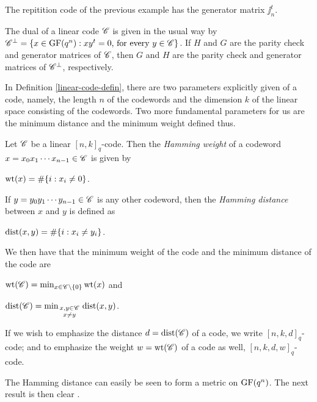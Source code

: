 \documentclass[../../../main]{subfiles}
\begin{document}
\begin{ex}
 The repitition code of the previous example has the generator matrix $\jj_n^t$.
\end{ex}

The dual of a linear code $\mathscr{C}$ is given in the usual way by $\mathscr{C}^\perp = \{x \in \text{GF}(q^n) : xy^t=0 \text{, for every }y\in\mathscr{C}\}$. If $H$ and $G$ are the parity check and generator matrices of $\mathscr{C}$, then $G$ and $H$ are the parity check and generator matrices of $\mathscr{C}^\perp$, respectively.

In Definition \ref{linear-code-defin}, there are two parameters explicitly given of a code, namely, the length $n$ of the codewords and the dimension $k$ of the linear space consisting of the codewords. Two more fundamental parameters for us are the minimum distance and the minimum weight defined thus.

\begin{defin}\label{wt-dist}
 Let $\mathscr{C}$ be a linear $[n,k]_q$-code. Then the {\it Hamming weight} of a codeword $x=x_0 x_1 \cdots x_{n-1} \in \mathscr{C}$ is given by 
 \begin{defenum}
 \item $\text{wt}(x) = \#\{i : x_i \neq 0\}$. 
 \end{defenum}
 If $y=y_0 y_1 \cdots y_{n-1} \in \mathscr{C}$ is any other codeword, then the {\it Hamming distance} between $x$ and $y$ is defined as 
 \begin{defenum}[resume]
 \item $\text{dist}(x,y) = \#\{i : x_i \neq y_i\}$. 
 \end{defenum}
 We then have that the minimum weight of the code and the minimum distance of the code are 
 \begin{defenum}[resume]
 \item $\text{wt}(\mathscr{C}) = \min_{x \in \mathscr{C}\backslash\{0\}} \text{wt}(x)$ and
 \item $\text{dist}(\mathscr{C}) = \min_{\begin{smallmatrix}x,y\in\mathscr{C}\\ x \neq y\end{smallmatrix}}\text{dist}(x,y)$. 
 \end{defenum}
 If we wish to emphasize the distance $d=\text{dist}(\mathscr{C})$ of a code, we write $[n,k,d]_q$-code; and to emphasize the weight $w=\text{wt}(\mathscr{C})$ of a code as well, $[n,k,d,w]_q$-code.
\end{defin}

The Hamming distance can easily be seen to form a metric on $\text{GF}(q^n)$. The next result is then clear \cite[see][Theorem 1.9]{hill-coding}.
\end{document}
